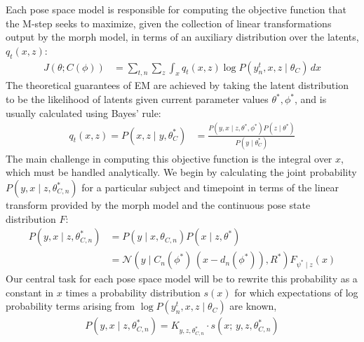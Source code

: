 \documentclass{article}         %
\newcommand{\NN}{\mathcal{N}}
\begin{document}
Each pose space model is responsible for computing the objective function that the M-step seeks to maximize, given the collection of linear transformations output by the morph model, in terms of an auxiliary distribution over the latents, $q_t(x, z)$:
\begin{align}
    J(\theta; C(\phi)) &= \sum_{t, n}\sum_z \int_x q_t(x, z) \log P(y^t_n, x, z \mid \theta_C) \, dx 
    \label{eq:obj-general}
\end{align}
The theoretical guarantees of EM are achieved by taking the latent distribution to be the likelihood of latents given current parameter values $\theta^*, \phi^*$, and is usually calculated using Bayes' rule:
\begin{align}
    q_t(x, z) = P(x, z \mid y, \theta_C^*) &= \frac{P(y, x \mid z, \theta^*, \phi^*) P(z\mid \theta^*)}{P(y \mid \theta_C^*)}
    \label{eq:q-general}
\end{align}
The main challenge in computing this objective function is the integral over $x$, which must be handled analytically. We begin by calculating the joint probability $P(y, x \mid z, \theta_{C,n}^*)$ for a particular subject and timepoint in terms of the linear transform provided by the morph model and the continuous pose state distribution $F$:
\begin{align}
    P(y, x \mid z, \theta_{C, n}^*) &= P(y \mid x, \theta_{C, n}) P(x\mid z, \theta^*) \\
    &= \NN(y\mid C_n(\phi^*)\, (x - d_n(\phi^*)), R^*) F_{\psi^*\mid z}(x) \label{eq:norm-F-prod}
\end{align}
Our central task for each pose space model will be to rewrite this probability as a constant in $x$ times a probability distribution $s(x)$ for which expectations of log probability terms arising from $\log P(y^t_n, x, z \mid \theta_C)$ are known,
\begin{align}
    P(y, x \mid z, \theta^*_{C, n}) = K_{y, z, \theta^*_{C, n}}\cdot s(x;\, y, z, \theta^*_{C, n})
    \label{eq:s-defn}
\end{align}
\end{document}
